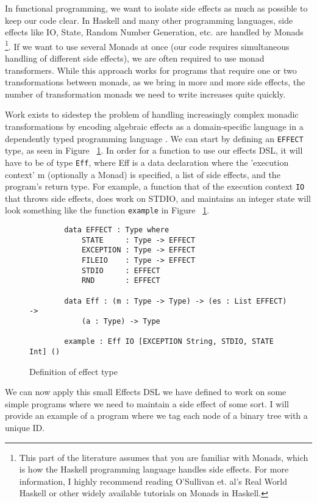 In functional programming, we want to isolate side effects as much as possible
to keep our code clear. In Haskell and many other programming languages, side
effects like IO, State, Random Number Generation, etc. are handled by Monads
\cite{realworldhaskell}\footnote{This part of the literature assumes that you
are familiar with Monads, which is how the Haskell programming language handles
side effects. For more information, I highly recommend reading O'Sullivan et.
al's Real World Haskell or other widely available tutorials on Monads in
Haskell.}. If we want to use several Monads at once (our code requires
simultaneous handling of different side effects), we are often required to use
monad transformers. While this approach works for programs that require one or
two transformations between monads, as we bring in more and more side effects,
the number of transformation monads we need to write increases quite quickly. 

Work exists to sidestep the problem of handling increasingly complex monadic
transformations by encoding algebraic effects as a domain-specific language in a
dependently typed programming language \cite{algebraic}. We can start by
defining an \texttt{EFFECT} type, as seen in Figure ~\ref{effects_def}. In order
for a function to use our effects DSL, it will have to be of type \texttt{Eff},
where Eff is a data declaration where the 'execution context' m (optionally a
Monad) is specified, a list of side effects, and the program's return type. For
example, a function that of the execution context \texttt{IO} that throws side
effects, does work on STDIO, and maintains an integer state will look something
like the function \texttt{example} in Figure ~\ref{effects_def}. 

\begin{figure}[ht!!!!]
    \caption{Definition of effect type}
    \label{effects_def}
    \begin{lstlisting}
        data EFFECT : Type where
            STATE     : Type -> EFFECT
            EXCEPTION : Type -> EFFECT
            FILEIO    : Type -> EFFECT
            STDIO     : EFFECT
            RND       : EFFECT
        
        data Eff : (m : Type -> Type) -> (es : List EFFECT) -> 
            (a : Type) -> Type
    
        example : Eff IO [EXCEPTION String, STDIO, STATE Int] ()
    \end{lstlisting}
\end{figure}

We can now apply this small Effects DSL we have defined to work on some simple
programs where we need to maintain a side effect of some sort. I will provide an
example of a program where we tag each node of a binary tree with a unique ID. 

